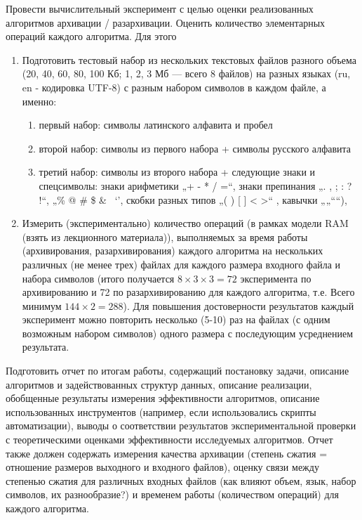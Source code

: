 \documentclass[russian, a4paper, 12pt]{article}
\begin{document}
Провести вычислительный эксперимент с целью оценки реализованных
алгоритмов архивации / разархивации. Оценить количество элементарных операций
каждого алгоритма.
Для этого
\begin{enumerate}
  \item Подготовить тестовый набор из нескольких текстовых файлов разного объема
  (20, 40, 60, 80, 100 Кб; 1, 2, 3 Мб — всего 8 файлов) на разных языках (ru, en -
  кодировка UTF-8) с разным набором символов в каждом файле, а именно:
  \begin{enumerate}
    \item первый набор: символы латинского алфавита и пробел
    \item второй набор: символы из первого набора + символы русского алфавита
    \item третий набор: символы из второго набора + следующие знаки и
    спецсимволы: знаки арифметики „+ - * / =“, знаки препинания „. , ; : ? !“,
    „\% @ \# \$ \& ~‘’, скобки разных типов „( ) [ ] { } < >“ , кавычки „„““),
  \end{enumerate}
  \item Измерить (экспериментально) количество операций (в рамках модели RAM (взять из
    лекционного материала)), выполняемых за время работы (архивирования,
    разархивирования) каждого алгоритма на нескольких различных (не менее
    трех) файлах для каждого размера входного файла и набора символов (итого
    получается $8\times3\times3 = 72$ эксперимента по архивированию и 72 по
    разархивированию для каждого алгоритма, т.е. Всего минимум $144\times2 = 288$).
    Для повышения достоверности результатов каждый эксперимент можно повторить
    несколько (5-10) раз на файлах (с одним возможным набором символов) одного размера с
    последующим усреднением результата.
\end{enumerate}

Подготовить отчет по итогам работы, содержащий постановку задачи, описание
алгоритмов и задействованных структур данных, описание реализации, обобщенные
результаты измерения эффективности алгоритмов, описание использованных
инструментов (например, если использовались скрипты автоматизации), выводы о
соответствии результатов экспериментальной проверки с теоретическими оценками
эффективности исследуемых алгоритмов.
Отчет также должен содержать измерения качества архивации (степень сжатия =
отношение размеров выходного и входного файлов), оценку связи между степенью
сжатия для различных входных файлов (как влияют объем, язык, набор символов, их
разнообразие?) и временем работы (количеством операций) для каждого алгоритма.
\end{document}
